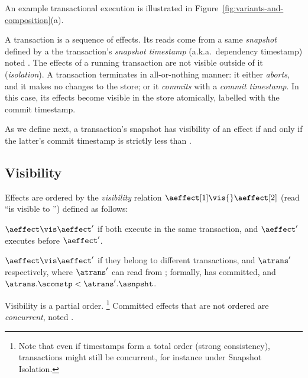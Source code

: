 An example transactional execution is illustrated in
Figure~\ref{fig:variants-and-composition}(a). 

A transaction is a sequence of effects.
Its reads come from a same \emph{snapshot} defined by a the
transaction's \emph{snapshot timestamp} (a.k.a.\ dependency timestamp)
noted \asnpsht{}.
The effects of a running transaction are not visible outside of it
(\emph{isolation}).
A transaction terminates in all-or-nothing manner: it either \emph{aborts},
and it makes no changes to the store; or it \emph{commits} with a
\emph{commit timestamp}.
In this case, its effects become visible in the store atomically,
labelled with the commit timestamp.

As we define next, a transaction's snapshot \asnpsht{} has visibility of
an effect if and only if the latter's commit timestamp \acomstp{} is
strictly less than \asnpsht.

\subsection{Visibility}
\label{sec:visibility}

Effects are ordered by the \emph{visibility} relation $\aeffect[1]
\vis{} \aeffect[2]$ (read ``\aeffect[1] is visible to \aeffect[2]'')
defined as follows:
\begin{compactitem}
\item %
  $\aeffect \vis \aeffect'$ if both execute in the same transaction,
  and $\aeffect'$ executes before $\aeffect'$.
\item %
  $\aeffect \vis \aeffect'$ if they belong to different transactions,
  \atrans{} and $\atrans'$ respectively, where $\atrans'$ can read from
  \atrans{}; formally, \atrans{} has committed, and $\atrans.\acomstp <
  \atrans'.\asnpsht$.
\end{compactitem}
%
Visibility is a partial order.%
%
\footnote{
%
  Note that even if timestamps form a total order (strong consistency),
  transactions might still be concurrent, for instance under Snapshot
  Isolation.
}
%
Committed effects that are not ordered are \emph{concurrent},
noted \concur{}.

